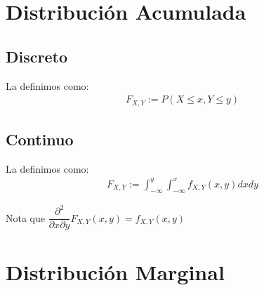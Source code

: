 \documentclass[12pt, fleqn]{report}                             %
\theoremstyle{break}                                            %
\begin{document}
        \clearpage
        \section{Distribución Acumulada}

            \vspace{1em}
            \subsection{Discreto}

                La definimos como:
                \begin{align*}
                    F_{X, Y} := P(X \leq x, Y \leq y)
                \end{align*}


            \vspace{1em}
            \subsection{Continuo}

                La definimos como:
                \begin{align*}
                    F_{X, Y} := \int_{-\infty}^y \int_{-\infty}^x f_{X, Y}(x, y) dx dy 
                \end{align*}

                Nota que $\dfrac{\partial^2}{\partial x \partial y} F_{X, Y}(x, y) = f_{X, Y}(x, y)$



        \clearpage
        \section{Distribución Marginal}
\end{document}
